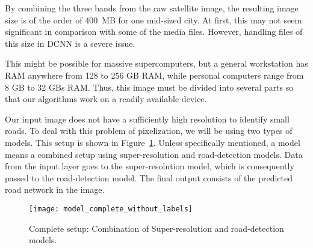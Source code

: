 By combining the three bands from the raw satellite image, the resulting image size is of the order of 400~MB for one mid-sized city. At first, this may not seem significant in comparison with some of the media files. However, handling files of this size in DCNN is a severe issue. 

This might be possible for massive supercomputers, but a general workstation has RAM anywhere from 128 to 256 GB RAM, while personal computers range from 8 GB to 32 GBs RAM. Thus, this image must be divided into several parts so that our algorithms work on a readily available device.

Our input image does not have a sufficiently high resolution to identify small roads. To deal with this problem of pixelization, we will be using two types of models. This setup is shown in Figure~\ref{fig:model_complete_without_labels}. Unless specifically mentioned, a model means a combined setup using super-resolution and road-detection models. Data from the input layer goes to the super-resolution model, which is consequently passed to the road-detection model. The final output consists of the predicted road network in the image.

\begin{figure}[h!]
  \centering
  \texttt{[image: model\_complete\_without\_labels]}
  \caption{Complete setup: Combination of Super-resolution and road-detection models.}
  \label{fig:model_complete_without_labels}
\end{figure}
